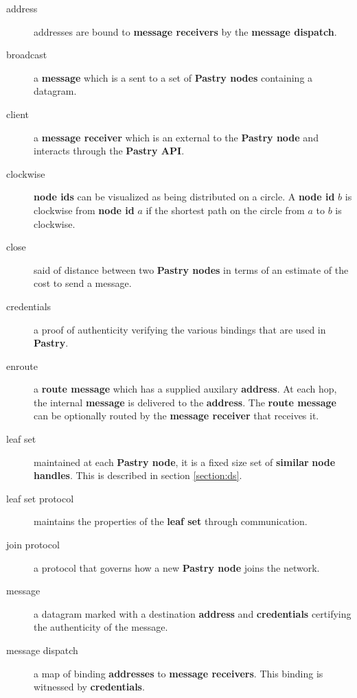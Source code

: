 \documentclass{article}
\begin{document}
\begin{description}

\item [address] addresses are bound to {\bf message receivers} by the
  {\bf message dispatch}.

\item [broadcast] a {\bf message} which is a sent to a set of {\bf
  Pastry nodes} containing a datagram.

\item [client] a {\bf message receiver} which is an external to the
  {\bf Pastry node} and interacts through the {\bf Pastry API}.

\item [clockwise] {\bf node ids} can be visualized as being
  distributed on a circle.  A {\bf node id} $b$ is clockwise from {\bf
  node id} $a$ if the shortest path on the circle from $a$ to $b$ is
  clockwise.

\item [close] said of distance between two {\bf Pastry nodes} in terms of an
  estimate of the cost to send a message.

\item [credentials] a proof of authenticity verifying the various
  bindings that are used in {\bf Pastry}.

\item [enroute] a {\bf route message} which has a supplied auxilary
  {\bf address}.  At each hop, the internal {\bf message} is delivered
  to the {\bf address}.  The {\bf route message} can be optionally
  routed by the {\bf message receiver} that receives it. 

\item [leaf set] maintained at each {\bf Pastry node}, it is a fixed
  size set of {\bf similar} {\bf node handles}.  This is described in
  section \ref{section:ds}.

\item [leaf set protocol] maintains the properties of the {\bf leaf set}
  through communication.

\item [join protocol] a protocol that governs how a new {\bf Pastry
  node} joins the network.

\item [message] a datagram marked with a destination {\bf address} and
  {\bf credentials} certifying the authenticity of the message.

\item [message dispatch] a map of binding {\bf addresses} to {\bf
  message receivers}.  This binding is witnessed by {\bf credentials}.


\end{description}
\end{document}
